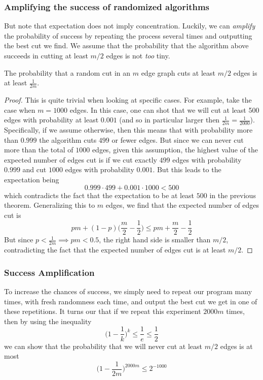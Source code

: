 \subsubsection{Amplifying the success of randomized algorithms}

  But note that expectation does not imply concentration. Luckily, we can \textit{amplify} the probability of success by repeating the process several times and outputting the best cut we find. We assume that the probability that the algorithm above succeeds in cutting at least $m/2$ edges is not \textit{too} tiny. 

  \begin{lemma}
  The probability that a random cut in an $m$ edge graph cuts at least $m/2$ edges is at least $\frac{1}{2m}$. 
  \end{lemma}
  \begin{proof}
  This is quite trivial when looking at specific cases. For example, take the case when $m =1000$ edges. In this case, one can shot that we will cut at least 500 edges with probability at least $0.001$ (and so in particular larger then $\frac{1}{2m} = \frac{1}{2000}$). Specifically, if we assume otherwise, then this means that with probability more than $0.999$ the algorithm cuts $499$ or fewer edges. But since we can never cut more than the total of $1000$ edges, given this assumption, the highest value of the expected number of edges cut is if we cut exactly $499$ edges with probability $0.999$ and cut $1000$ edges with probability $0.001$. But this leads to the expectation being
  \[0.999 \cdot 499 + 0.001 \cdot 1000 < 500\]
  which contradicts the fact that the expectation to be at least $500$ in the previous theorem. Generalizing this to $m$ edges, we find that the expected number of edges cut is 
  \[pm + (1-p) \Big( \frac{m}{2} - \frac{1}{2} \Big) \leq pm + \frac{m}{2} - \frac{1}{2}\]
  But since $p < \frac{1}{2m} \implies pm < 0.5$, the right hand side is smaller than $m/2$, contradicting the fact that the expected number of edges cut is at least $m/2$. 
  \end{proof}

  \subsubsection{Success Amplification}
  To increase the chances of success, we simply need to repeat our program many times, with fresh randomness each time, and output the best cut we get in one of these repetitions. It turns our that if we repeat this experiment $2000m$ times, then by using the inequality
  \[\Big( 1 - \frac{1}{k} \Big)^k \leq \frac{1}{e} \leq \frac{1}{2}\]
  we can show that the probability that we will never cut at least $m/2$ edges is at most 
  \[\Big( 1 - \frac{1}{2m} \Big)^{2000m} \leq 2^{-1000}\]

